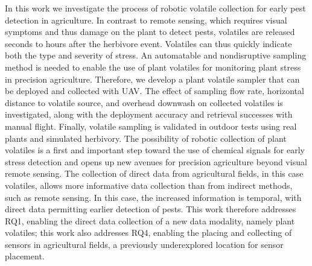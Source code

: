 In this work we investigate the process of robotic volatile collection for early pest detection in agriculture. In contrast to remote sensing, which requires visual symptoms and thus damage on the plant to detect pests, volatiles are released seconds to hours after the herbivore event. Volatiles can thus quickly indicate both the type and severity of stress. An automatable and nondisruptive sampling method is needed to enable the use of plant volatiles for monitoring plant stress in precision agriculture. Therefore, we develop a plant volatile sampler that can be deployed and collected with UAV. The effect of sampling flow rate, horizontal distance to volatile source, and overhead downwash on collected volatiles is investigated, along with the deployment accuracy and retrieval successes with manual flight. Finally, volatile sampling is validated in outdoor tests using real plants and simulated herbivory. The possibility of robotic collection of plant volatiles is a first and important step toward the use of chemical signals for early stress detection and opens up new avenues for precision agriculture beyond visual remote sensing.
The collection of direct data from agricultural fields, in this case volatiles, allows more informative data collection than from indirect methods, such as remote sensing. In this case, the increased information is temporal, with direct data permitting earlier detection of pests. 
This work therefore addresses RQ1, enabling the direct data collection of a new data modality, namely plant volatiles; this work also addresses RQ4, enabling the placing and collecting of sensors in agricultural fields, a previously underexplored location for sensor placement. 


